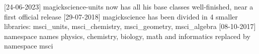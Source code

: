 \mbox{[}24-\/06-\/2023\mbox{]} magickscience-\/units now has all his base classes well-\/finished, near a first official release \mbox{[}29-\/07-\/2018\mbox{]} magickscience has been divided in 4 smaller libraries\+: msci\+\_\+units, msci\+\_\+chemistry, msci\+\_\+geometry, msci\+\_\+algebra \mbox{[}08-\/10-\/2017\mbox{]} namespace names physics, chemistry, biology, math and informatics replaced by namespace msci 